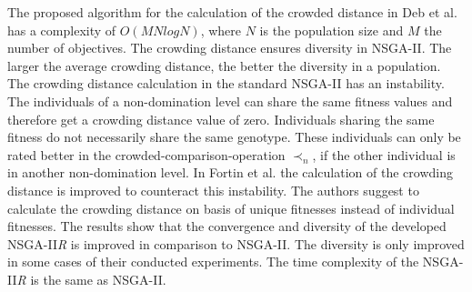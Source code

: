     The proposed algorithm for the calculation of the crowded distance in Deb et al.\cite{Deb:2002} has a complexity of $O(MN logN)$, where $N$ is the population size and $M$ the number of objectives. The crowding distance ensures diversity in NSGA-II. The larger the average crowding distance, the better the diversity in a population.\\
    \newline
    The crowding distance calculation in the standard NSGA-II\cite{Deb:2002} has an instability. The individuals of a non-domination level can share the same fitness values and therefore get a crowding distance value of zero. Individuals sharing the same fitness do not necessarily share the same genotype. These individuals can only be rated better in the crowded-comparison-operation $\prec_n$, if the other individual is in another non-domination level. In Fortin et al.\cite{Fortin:2013} the calculation of the crowding distance is improved to counteract this instability. The authors suggest to calculate the crowding distance on basis of unique fitnesses instead of individual fitnesses. The results show that the convergence and diversity of the developed NSGA-II\textit{R} is improved in comparison to NSGA-II. The diversity is only improved in some cases of their conducted experiments. The time complexity of the NSGA-II\textit{R} is the same as NSGA-II.
    
